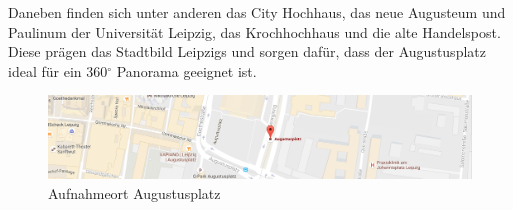 \documentclass[liststotoc,bibtotoc,fontsize=14pt,]{scrreprt}
\begin{document}
	\bigskip
	Daneben finden sich unter anderen das City Hochhaus, das neue Augusteum und Paulinum der Universität Leipzig, das Krochhochhaus und die alte Handelspost. Diese prägen das Stadtbild Leipzigs und sorgen dafür, dass der Augustusplatz ideal für ein 360$^\circ$ Panorama geeignet ist.
			\begin{figure}[H]
				\includegraphics[width=\linewidth]{img/places/ap_map.jpg}
				\caption{Aufnahmeort Augustusplatz}
				\label{img:ak_map}
			\end{figure}
	
\end{document}
